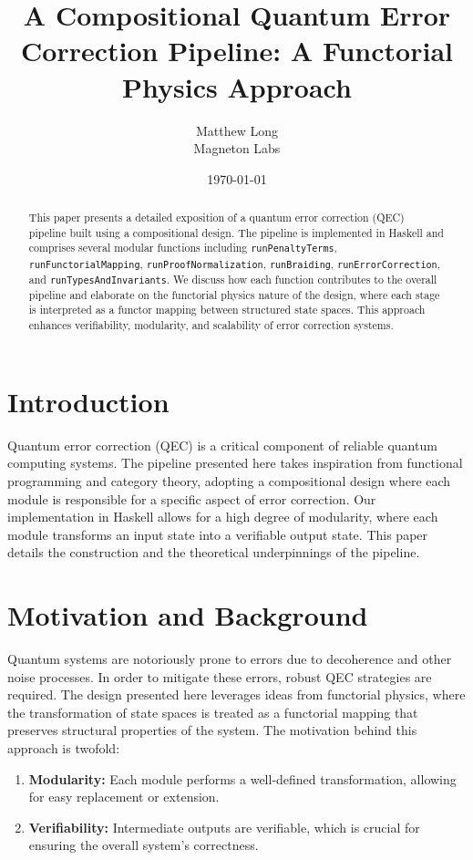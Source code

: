 \documentclass[11pt]{article}
\title{A Compositional Quantum Error Correction Pipeline: A Functorial Physics Approach}
\author{Matthew Long \\
Magneton Labs}
\date{\today}
\begin{document}
\maketitle

\begin{abstract}
This paper presents a detailed exposition of a quantum error correction (QEC) pipeline built using a compositional design. The pipeline is implemented in Haskell and comprises several modular functions including \texttt{runPenaltyTerms}, \texttt{runFunctorialMapping}, \texttt{runProofNormalization}, \texttt{runBraiding}, \texttt{runErrorCorrection}, and \texttt{runTypesAndInvariants}. We discuss how each function contributes to the overall pipeline and elaborate on the functorial physics nature of the design, where each stage is interpreted as a functor mapping between structured state spaces. This approach enhances verifiability, modularity, and scalability of error correction systems.
\end{abstract}

\tableofcontents
\newpage

\section{Introduction}
Quantum error correction (QEC) is a critical component of reliable quantum computing systems. The pipeline presented here takes inspiration from functional programming and category theory, adopting a compositional design where each module is responsible for a specific aspect of error correction. Our implementation in Haskell allows for a high degree of modularity, where each module transforms an input state into a verifiable output state. This paper details the construction and the theoretical underpinnings of the pipeline.

\section{Motivation and Background}
Quantum systems are notoriously prone to errors due to decoherence and other noise processes. In order to mitigate these errors, robust QEC strategies are required. The design presented here leverages ideas from functorial physics, where the transformation of state spaces is treated as a functorial mapping that preserves structural properties of the system. The motivation behind this approach is twofold:
\begin{enumerate}
    \item \textbf{Modularity:} Each module performs a well-defined transformation, allowing for easy replacement or extension.
    \item \textbf{Verifiability:} Intermediate outputs are verifiable, which is crucial for ensuring the overall system's correctness.
\end{enumerate}
\end{document}
